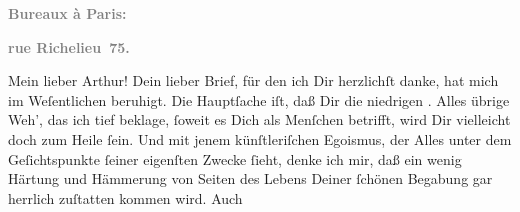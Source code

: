 \pstart
           \begin{otherlanguage}{french}\textcolor{gray}{\textbf{\textbf{Bureaux à Paris:}}}\end{otherlanguage}\pend
           
\pstart
           \begin{otherlanguage}{french}\textcolor{gray}{\textbf{\textbf{rue Richelieu 75.}}}\end{otherlanguage}\pend
           
\pstart\center{}Mein lieber Arthur!\pend\vspace{0.5em}
\pstart
           Dein lieber Brief, für den ich Dir herzlichſt danke, hat mich im Weſentlichen
               beruhigt. Die Hauptſache iſt, daß Dir die niedrigen \label{K_L02708-1v}\label{K_L02708-1}. Alles übrige Weh’, das ich tief
               beklage, ſoweit es Dich als Menſchen betrifft, wird Dir vielleicht doch zum Heile
               ſein. Und mit jenem künſtleriſchen Egoismus, der Alles unter dem Geſichtspunkte
               ſeiner eigenſten Zwecke ſieht, denke ich mir, daß ein wenig Härtung und Hämmerung von
               Seiten des Lebens Deiner ſchönen Begabung gar herrlich zuſtatten kommen wird. Auch
